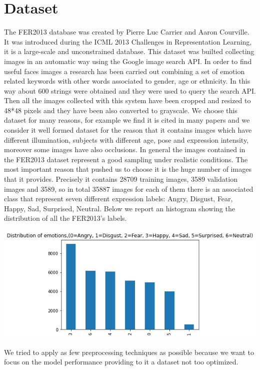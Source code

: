 \documentclass[10pt,twocolumn,letterpaper]{article}
\begin{document}
\section{Dataset}
The FER2013 database was created by Pierre Luc Carrier and Aaron Courville. 
It was introduced during the ICML 2013 Challenges in Representation Learning, 
it is a large-scale and unconstrained database.
This dataset was builted collecting images in an automatic way using the Google image search API.
In order to find useful faces images 
a research has been carried out combining a set of emotion related keywords with other words associated
to gender, age or ethnicity. 
In this way about 600 strings were obtained and they were used to query the search API.
Then all the images collected with this system have been cropped and resized to 48*48 pixels
and they have been also converted to grayscale.
We choose this dataset for many reasons, for example we find it is cited in many papers and we consider it well formed dataset for the reason that it contains 
images which have different illumination, subjects with different age, pose and expression intensity, moreover some images
have also occlusions. In general the images contained in the FER2013 dataset represent a good sampling under realistic conditions. 
The most important reason that pushed us to choose it is the huge number of images that it provides.
Precisely it contains 28709 training images, 3589 validation images and 3589, so in total 35887 
images for each of them there is an associated class that represent seven different expression labels: Angry, Disgust, Fear, Happy, Sad, Surprised, Neutral.
Below we report an histogram showing the distribution of all the FER2013's labels.
\begin{center}
   \includegraphics[width=1\linewidth]{./immagini/7_classi.png}
\end{center}
We tried to apply as few preprocessing techniques as possible because we want to focus on the model performance providing to it a dataset not too optimized.
\end{document}
